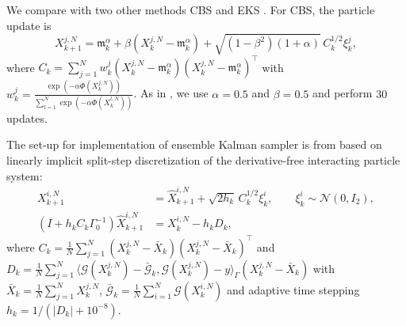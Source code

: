 \documentclass{article}
\def\m{\mathfrak{m}}
\numberwithin{equation}{section}
\begin{document}
We compare with two other methods CBS \cite{carrillo2022consensus_sampling} and EKS \cite{garbunoinigo2019interacting}. For CBS, the particle update \cite[Section~2.5]{carrillo2022consensus_sampling} is
\begin{equation}
    X_{k+1}^{j, N}
    = \m_{k}^{\alpha} +
    \beta( X_k^{j, N}-\m_{k}^\alpha)
    +
    \sqrt{(1-\beta^2)(1+\alpha)}\,
    C_{k}^{1/2}\xi_k^{j},
    \label{eq:cbs_update}
\end{equation}
where $
    C_{k} = \sum_{j=1}^{N}
    w_k^j(X_k^{j,N}-\m_{k}^\alpha)
    (X_k^{j,N}-\m^{\alpha}_k)^\top$ with $
    w_k^{j}= \frac{\exp(-\alpha\Phi(X_k^{j,N}))}{\sum_{l=1}^{N}
        \exp(-\alpha\Phi(X_k^{l,N}))}$. As in \cite{carrillo2022consensus_sampling}, we use $\alpha=0.5$ and $\beta=0.5$ and perform $30$ updates. 

The set-up for implementation of ensemble Kalman sampler is from \cite{garbunoinigo2019interacting} based on linearly implicit split-step discretization of the derivative-free interacting particle system:
\begin{align*}
    X_{k+1}^{i,N} &=
    \hat{X}_{k+1}^{i, N} +
    \sqrt{2 h_k}\,
    C_k^{1/2}\xi_k^{i},
    \qquad
    \xi_k^{i}\sim\mathcal{N}(0,I_2), \\
    (I+ h_k C_k\Gamma_0^{-1})\hat{X}_{k+1}^{i,N} & = X_k^{i,N} - h_k D_k,
\end{align*}
where  $C_k = \frac{1}{N}\sum_{j=1}^{N}
    ( X_k^{j,N}-\bar{X}_k)
    (X_k^{j,N}-\bar{X}_k)^\top$ and $D_k =
    \frac{1}{N}
    \sum_{j=1}^{N}\langle \mathcal{G}(X_k^{j,N})-
        \bar{\mathcal{G}}_k,\mathcal{G}(X_k^{j,N})-y\rangle_{\Gamma}(X_k^{j,N}-\bar{X}_k)$ 
with  $\bar{X}_k =\frac{1}{N}\sum_{j=1}^{N}X_k^{j,N}$, $\bar{\mathcal{G}}_k = \frac{1}{N}\sum_{i=1}^{N}\mathcal{G}(X_k^{i,N})$
and adaptive time stepping $ h_k ={1}/(|D_k|+10^{-8})$. 

 
\end{document}
